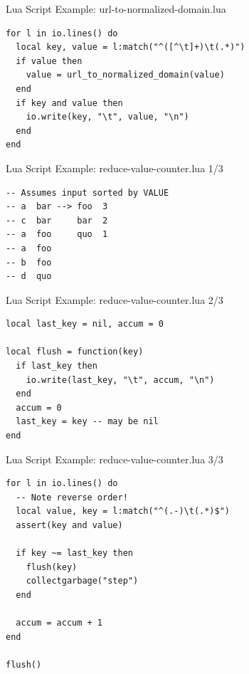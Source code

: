 \documentclass[handout]{beamer}
\begin{document}

\begin{frame}[fragile]{Lua Script Example: url-to-normalized-domain.lua}

\begin{verbatim}
for l in io.lines() do
  local key, value = l:match("^([^\t]+)\t(.*)")
  if value then
    value = url_to_normalized_domain(value)
  end
  if key and value then
    io.write(key, "\t", value, "\n")
  end
end
\end{verbatim}

\end{frame}


\begin{frame}[fragile]{Lua Script Example: reduce-value-counter.lua 1/3}

\begin{verbatim}
-- Assumes input sorted by VALUE
-- a  bar --> foo  3
-- c  bar     bar  2
-- a  foo     quo  1
-- a  foo
-- b  foo
-- d  quo
\end{verbatim}

\end{frame}


\begin{frame}[fragile]{Lua Script Example: reduce-value-counter.lua 2/3}

\begin{verbatim}
local last_key = nil, accum = 0

local flush = function(key)
  if last_key then
    io.write(last_key, "\t", accum, "\n")
  end
  accum = 0
  last_key = key -- may be nil
end
\end{verbatim}

\end{frame}


\begin{frame}[fragile]{Lua Script Example: reduce-value-counter.lua 3/3}

\begin{verbatim}
for l in io.lines() do
  -- Note reverse order!
  local value, key = l:match("^(.-)\t(.*)$")
  assert(key and value)

  if key ~= last_key then
    flush(key)
    collectgarbage("step")
  end

  accum = accum + 1
end

flush()
\end{verbatim}

\end{frame}
\end{document}
